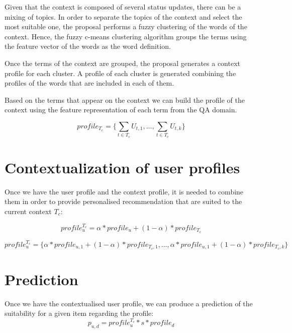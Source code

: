 \documentclass[preprint]{elsarticle}
\begin{document}
\begin{spacing}{2}
Given that the context is composed of several status updates, there can be a mixing of topics. In order to separate the topics of the context and select the most suitable one, the proposal performs a fuzzy clustering of the words of the context. Hence, the fuzzy c-means clustering algorithm groups the terms using the feature vector of the words as the word definition.

Once the terms of the context are grouped, the proposal generates a context profile for each cluster. A profile of each cluster is generated combining the profiles of the words that are included in each of them.

Based on the terms that appear on the context we can build the profile of the context using the feature representation of each term from the QA domain.

\begin{equation}
	profile_{T_c} = \{\sum_{t \in T_c} U_{t,1}, \dots, \sum_{t \in T_c} U_{t,k} \}
\end{equation}

\section{Contextualization of user profiles}

Once we have the user profile and the context profile, it is needed to combine them in order to provide personalised recommendation that are suited to the current context $T_c$:

\begin{equation}
	profile_u^{T_c} = \alpha * profile_u + (1- \alpha )*profile_{T_c}
\end{equation}

\begin{equation}
	profile_u^{T_c} = \{ \alpha * profile_{u,1} + (1- \alpha ) * profile_{T_c,1},\dots, \alpha * profile_{u,1} + ( 1 - \alpha ) * profile_{T_c,k} \}
\end{equation}

\section{Prediction}

Once we have the contextualised user profile, we can produce a prediction of the suitability for a given item regarding the profile:
\begin{equation}
	p_{u,d} = profile_u^{T_c}*s*profile_d
\end{equation}


\end{spacing}
\end{document}
